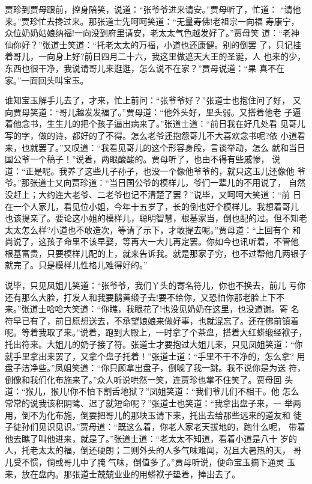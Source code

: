 贾珍到贾母跟前，控身陪笑，说道：“张爷爷进来请安。”贾母听了，忙道：
“请他来。”贾珍忙去搀过来。那张道士先呵呵笑道：“无量寿佛!老祖宗一向福
寿康宁，众位奶奶姑娘纳福!一向没到府里请安，老太太气色越发好了。”贾母笑
道：“老神仙你好？”张道士笑道：“托老太太的万福，小道也还康健。别的倒罢
了，只记挂着哥儿，一向身上好?前日四月二十六，我这里做遮天大王的圣诞，人
也来的少，东西也很干净，我说请哥儿来逛逛，怎么说不在家？”贾母说道：“果
真不在家。”一面回头叫宝玉。

谁知宝玉解手儿去了，才来，忙上前问：“张爷爷好？”张道士也抱住问了好，
又向贾母笑道：“哥儿越发发福了。”贾母道：“他外头好，里头弱。又搭着他老
子逼着他念书，生生儿的把个孩子逼出病来了。”张道士道：“前日我在好几处看
见哥儿写的字，做的诗，都好的了不得。怎么老爷还抱怨哥儿不大喜欢念书呢?依
小道看来，也就罢了。”又叹道：“我看见哥儿的这个形容身段，言谈举动，怎么
就和当日国公爷一个稿子！”说着，两眼酸酸的。贾母听了，也由不得有些戚惨，
说道：“正是呢。我养了这些儿子孙子，也没一个像他爷爷的，就只这玉儿还像他
爷爷。”那张道士又向贾珍道：“当日国公爷的模样儿，爷们一辈儿的不用说了，
自然没赶上；大约连大老爷、二老爷也记不清楚了罢？”说毕，又呵呵大笑道：“前
日在一个人家儿，看见位小姐，今年十五岁了，长的倒也好个模样儿。我想着哥儿
也该提亲了。要论这小姐的模样儿，聪明智慧，根基家当，倒也配的过。但不知老
太太怎么样?小道也不敢造次，等请了示下，才敢提去呢。”贾母道：“上回有个
和尚说了，这孩子命里不该早娶，等再大一大儿再定罢。你如今也讯听着，不管他
根基富贵，只要模样儿配的上，就来告诉我。就是那家子穷，也不过帮他几两银子
就完了。只是模样儿性格儿难得好的。”

说毕，只见凤姐儿笑道：“张爷爷，我们丫头的寄名符儿，你也不换去，前儿
亏你还有那么大脸，打发人和我要鹅黄缎子去!要不给你，又恐怕你那老脸上下不
来。”张道士哈哈大笑道：“你瞧，我眼花了!也没见奶奶在这里，也没道谢。寄
名符早已有了，前日原想送去，不承望娘娘来做好事，也就混忘了。还在佛前镇着
呢。等着我取了来。”说着，跑到大殿上，一时拿了个茶盘，搭着大红蟒缎经袱子，
托出符来。大姐儿的奶子接了符。张道士才要抱过大姐儿来，只见凤姐笑道：“你
就手里拿出来罢了，又拿个盘子托着！”张道士道：“手里不干不净的，怎么拿?
用盘子洁净些。”凤姐笑道：“你只顾拿出盘子，倒唬了我一跳。我不说你是为送
符，倒像和我们化布施来了。”众人听说哄然一笑，连贾珍也掌不住笑了。贾母回
头道：“猴儿，猴儿!你不怕下割舌地狱？”凤姐笑道：“我们爷儿们不相干。他
怎么常常的说我该积阴骘、迟了就短命呢？”张道士也笑道：“我拿出盘子来，一
举两用，倒不为化布施，倒要把哥儿的那块玉请下来，托出去给那些远来的道友和
徒子徒孙们见识见识。”贾母道：“既这么着，你老人家老天拔地的，跑什么呢，
带着他去瞧了叫他进来，就是了。”张道士道：“老太太不知道，看着小道是八十
岁的人，托老太太的福，倒还硬朗；二则外头的人多气味难闻，况且大暑热的天，
哥儿受不惯，倘或哥儿中了腌气味，倒值多了。”贾母听说，便命宝玉摘下通灵
玉来，放在盘内。那张道士兢兢业业的用蟒袱子垫着，捧出去了。

